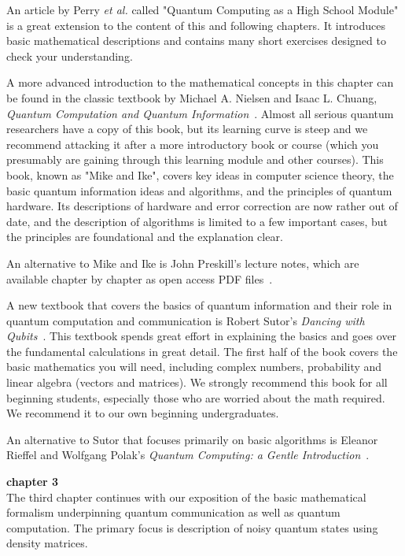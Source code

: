 An article by Perry \emph{et al.} called "Quantum Computing as a High School Module" is a great extension to the content of this and following chapters. It introduces basic mathematical descriptions and contains many short exercises designed to check your understanding.

A more advanced introduction to the mathematical concepts in this chapter can be found in the classic textbook by Michael A. Nielsen and Isaac L. Chuang, \emph{Quantum Computation and Quantum Information}~\cite{nielsen-chuang:qci}. Almost all serious quantum researchers have a copy of this book, but its learning curve is steep and we recommend attacking it after a more introductory book or course (which you presumably are gaining through this learning module and other courses). This book, known as "Mike and Ike", covers key ideas in computer science theory, the basic quantum information ideas and algorithms, and the principles of quantum hardware. Its descriptions of hardware and error correction are now rather out of date, and the description of algorithms is limited to a few important cases, but the principles are foundational and the explanation clear.

An alternative to Mike and Ike is John Preskill's lecture notes, which are available chapter by chapter as open access PDF files~\cite{preskill:PH-CS219}.

A new textbook that covers the basics of quantum information and their role in quantum computation and communication is Robert Sutor's \emph{Dancing with Qubits}~\cite{sutor19:dancing}. This textbook spends great effort in explaining the basics and goes over the fundamental calculations in great detail. The first half of the book covers the basic mathematics you will need, including complex numbers, probability and linear algebra (vectors and matrices). We strongly recommend this book for all beginning students, especially those who are worried about the math required. We recommend it to our own beginning undergraduates.

An alternative to Sutor that focuses primarily on basic algorithms is Eleanor Rieffel and Wolfgang Polak's \emph{Quantum Computing: a Gentle Introduction}~\cite{rieffel2011quantum}.

{\bf chapter 3}\\

The third chapter continues with our exposition of the basic mathematical formalism underpinning quantum communication as well as quantum computation. The primary focus is description of noisy quantum states using density matrices.

